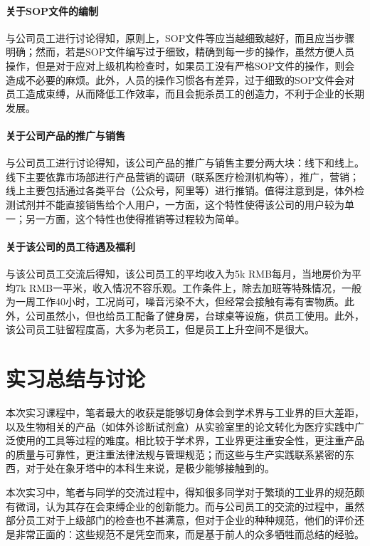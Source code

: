 \documentclass[cn,black,12pt,normal]{elegantnote}
\begin{document}
\paragraph{关于SOP文件的编制} 与公司员工进行讨论得知，原则上，SOP文件等应当越细致越好，而且应当步骤明确；然而，若是SOP文件编写过于细致，精确到每一步的操作，虽然方便人员操作，但是对于应对上级机构检查时，如果员工没有严格SOP文件的操作，则会造成不必要的麻烦。此外，人员的操作习惯各有差异，过于细致的SOP文件会对员工造成束缚，从而降低工作效率，而且会扼杀员工的创造力，不利于企业的长期发展。

\paragraph{关于公司产品的推广与销售} 与公司员工进行讨论得知，该公司产品的推广与销售主要分两大块：线下和线上。线下主要依靠市场部进行产品营销的调研（联系医疗检测机构等），推广，营销；线上主要包括通过各类平台（公众号，阿里等）进行推销。值得注意到是，体外检测试剂并不能直接销售给个人用户，一方面，这个特性使得该公司的用户较为单一；另一方面，这个特性也使得推销等过程较为简单。

\paragraph{关于该公司的员工待遇及福利} 与该公司员工交流后得知，该公司员工的平均收入为5k RMB每月，当地房价为平均7k RMB一平米，收入情况不容乐观。工作条件上，除去加班等特殊情况，一般为一周工作40小时，工况尚可，噪音污染不大，但经常会接触有毒有害物质。此外，公司虽然小，但也给员工配备了健身房，台球桌等设施，供员工使用。此外，该公司员工驻留程度高，大多为老员工，但是员工上升空间不是很大。



\section{实习总结与讨论}

本次实习课程中，笔者最大的收获是能够切身体会到学术界与工业界的巨大差距，以及生物相关的产品（如体外诊断试剂盒）从实验室里的论文转化为医疗实践中广泛使用的工具等过程的难度。相比较于学术界，工业界更注重安全性，更注重产品的质量与可靠性，更注重法律法规与管理规范；而这些与生产实践联系紧密的东西，对于处在象牙塔中的本科生来说，是极少能够接触到的。

本次实习中，笔者与同学的交流过程中，得知很多同学对于繁琐的工业界的规范颇有微词，认为其存在会束缚企业的创新能力。而与公司员工的交流的过程中，虽然部分员工对于上级部门的检查也不甚满意，但对于企业的种种规范，他们的评价还是非常正面的：这些规范不是凭空而来，而是基于前人的众多牺牲而总结的经验。
\end{document}

